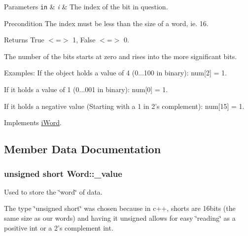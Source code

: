 \begin{DoxyParams}[1]{Parameters}
\mbox{\tt in}  & {\em i} & The index of the bit in question. \\
\hline
\end{DoxyParams}
\begin{DoxyPrecond}{Precondition}
The index must be less than the size of a word, ie. 16. 
\end{DoxyPrecond}
\begin{DoxyReturn}{Returns}
True $<$=$>$ 1, False $<$=$>$ 0.
\end{DoxyReturn}
The number of the bits starts at zero and rises into the more significant bits. \begin{DoxyParagraph}{Examples:}
If the object holds a value of 4 (0...100 in binary): num\mbox{[}2\mbox{]} = 1.\par
 If it holds a value of 1 (0...001 in binary): num\mbox{[}0\mbox{]} = 1.\par
 If it holds a negative value (Starting with a 1 in 2's complement): num\mbox{[}15\mbox{]} = 1. 
\end{DoxyParagraph}


Implements \hyperlink{classiWord_a0e83901b08763247527ce61c89fd847f}{iWord}.



\subsection{Member Data Documentation}
\hypertarget{classWord_a8b0aa1f2042266f307c51b3bdafa9128}{
\subsubsection[{\_\-value}]{\setlength{\rightskip}{0pt plus 5cm}unsigned short {\bf Word::\_\-value}}}
\label{classWord_a8b0aa1f2042266f307c51b3bdafa9128}


Used to store the \char`\"{}word\char`\"{} of data. 

The type \char`\"{}unsigned short\char`\"{} was chosen because in c++, shorts are 16bits (the same size as our words) and having it unsigned allows for easy \char`\"{}reading\char`\"{} as a positive int or a 2's complement int. 